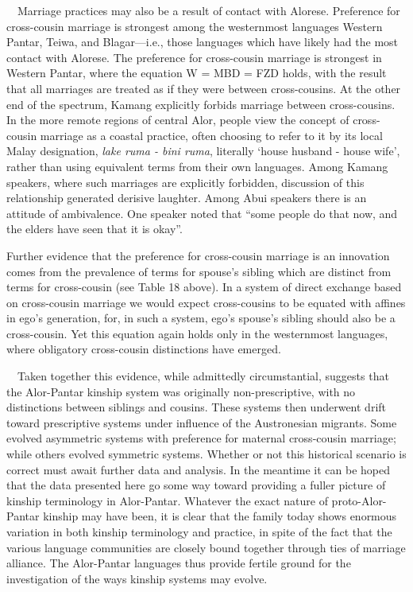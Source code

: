 \ \ Marriage practices may also be a result of contact with Alorese. Preference for cross-cousin marriage is strongest among the westernmost languages Western Pantar, Teiwa, and Blagar---i.e., those languages which have likely had the most contact with Alorese. The preference for cross-cousin marriage is strongest in Western Pantar, where the equation W = MBD = FZD holds, with the result that all marriages are treated as if they were between cross-cousins. At the other end of the spectrum, Kamang explicitly forbids marriage between cross-cousins. In the more remote regions of central Alor, people view the concept of cross-cousin marriage as a coastal practice, often choosing to refer to it by its local Malay designation, \textit{lake ruma - bini ruma}, literally {\textquoteleft}house husband - house wife{\textquoteright}, rather than using equivalent terms from their own languages. Among Kamang speakers, where such marriages are explicitly forbidden, discussion of this relationship generated derisive 
laughter. Among Abui speakers there is an attitude of ambivalence. One speaker noted that {\textquotedblleft}some people do that now, and the elders have seen that it is okay{\textquotedblright}. 

Further evidence that the preference for cross-cousin marriage is an innovation comes from the prevalence of terms for spouse{\textquoteright}s  sibling which are distinct from terms for cross-cousin (see Table 18 above). In a system of direct exchange based on cross-cousin marriage we would expect cross-cousins to be equated with affines in ego{\textquoteright}s generation, for, in such a system, ego{\textquoteright}s spouse{\textquoteright}s sibling should also be a cross-cousin. Yet this equation again holds only in the westernmost languages, where obligatory cross-cousin distinctions have emerged. 

\ \ Taken together this evidence, while admittedly circumstantial, suggests that the Alor-Pantar kinship system was originally non-prescriptive, with no distinctions between siblings and cousins. These systems then underwent drift toward prescriptive systems under influence of the Austronesian migrants. Some evolved asymmetric systems with preference for maternal cross-cousin marriage; while others evolved symmetric systems. Whether or not this historical scenario is correct must await further data and analysis. In the meantime it can be hoped that the data presented here go some way toward providing a fuller picture of kinship terminology in Alor-Pantar. Whatever the exact nature of proto-Alor-Pantar kinship may have been, it is clear that the family today shows enormous variation in both kinship terminology and practice, in spite of the fact that the various language communities are closely bound together through ties of marriage alliance. The Alor-Pantar languages thus provide fertile ground for the 
investigation of the ways kinship systems may evolve.

